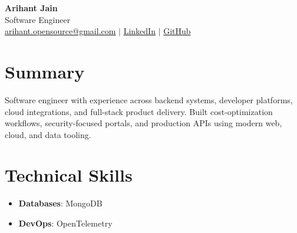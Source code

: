 \documentclass[11pt,a4paper]{article}
\begin{document}
\begin{center}
{\LARGE \textbf{Arihant Jain}}
\\ Software Engineer
\\ \href{mailto:arihant.opensource@gmail.com}{arihant.opensource@gmail.com} $\mid$ \href{https://linkedin.com/in/arihantjain1208}{LinkedIn} $\mid$ \href{https://github.com/Arihant1208}{GitHub}
\end{center}

\section{Summary}
Software engineer with experience across backend systems, developer platforms, cloud integrations, and full-stack product delivery. Built cost-optimization workflows, security-focused portals, and production APIs using modern web, cloud, and data tooling.

\section{Technical Skills}
\begin{itemize}
  \item \textbf{Databases}: MongoDB
  \item \textbf{DevOps}: OpenTelemetry
\end{itemize}
\end{document}

